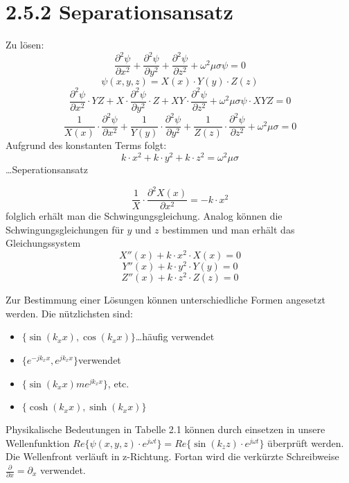 \documentclass[a4paper]{article}
\begin{document}
\section*{2.5.2 Separationsansatz}
Zu lösen:
\[\frac{\partial^2 \psi}{\partial x^2} + \frac{\partial ^2\psi}{\partial y^2} +\frac{\partial ^2\psi}{\partial z^2}  + \omega^2\mu\sigma\psi=0\]
\[\psi(x,y,z)=X(x)\cdot Y(y)\cdot Z(z)\]
\[\frac{\partial ^2\psi}{\partial x^2}\cdot YZ + X\cdot \frac{\partial ^2\psi}{\partial y^2}\cdot Z + XY\cdot \frac{\partial ^2\psi}{\partial z^2} + \omega^2 \mu\sigma\psi\cdot XYZ=0\]
\[\frac{1}{X(x)} \cdot \frac{\partial ^2\psi}{\partial x^2} + \frac{1}{Y(y)}\cdot \frac{\partial ^2\psi}{\partial y^2} + \frac{1}{Z(z)}\cdot \frac{\partial ^2\psi}{\partial z^2} + \omega^2\mu\sigma=0\]\newline
Aufgrund des konstanten Terms folgt:
\[k\cdot x^2 + k\cdot y^2 + k\cdot z^2 = \omega^2\mu\sigma\]\ldots Seperationsansatz

\[\frac{1}{X}\cdot \frac{\partial ^2X(x)}{\partial x^2} = -k\cdot x^2\]\newline
folglich erhält man die Schwingungsgleichung. Analog können die Schwingungsgleichungen für $y$ und $z$ bestimmen und man erhält das Gleichungssystem
\[X''(x)+k\cdot x^2\cdot X(x) = 0\]
\[Y''(x)+k\cdot y^2\cdot Y(y) = 0\]
\[Z''(x)+k\cdot z^2\cdot Z(z) = 0\]

Zur Bestimmung einer Lösungen können unterschiedliche Formen angesetzt werden. Die nützlichsten sind:
\begin{itemize}
    \item {} $\{\sin(k_{x}x), \cos(k_{x}x)\}$\ldots häufig verwendet
    \item {} $\{e^{-jk_{x}x}, e^{jk_{x}x}\}$ verwendet
\item {} $\{\sin(k_{x}x)m e^{jk_{x}x}\}$, etc.
    \item {} $\{\cosh(k_{x}x), \sinh(k_{x}x)\}$
\end{itemize}

Physikalische Bedeutungen in Tabelle 2.1 können durch einsetzen in unsere Wellenfunktion $Re\{\psi(x,y,z)\cdot e^{j\omega t}\}=Re\{\sin(k_{z}z)\cdot e^{j\omega t}\}$ überprüft werden. Die Wellenfront verläuft in z-Richtung.\newline
Fortan wird die verkürzte Schreibweise $\frac{\partial}{\partial x}  = \partial _{x}$ verwendet.\newline
\end{document}
